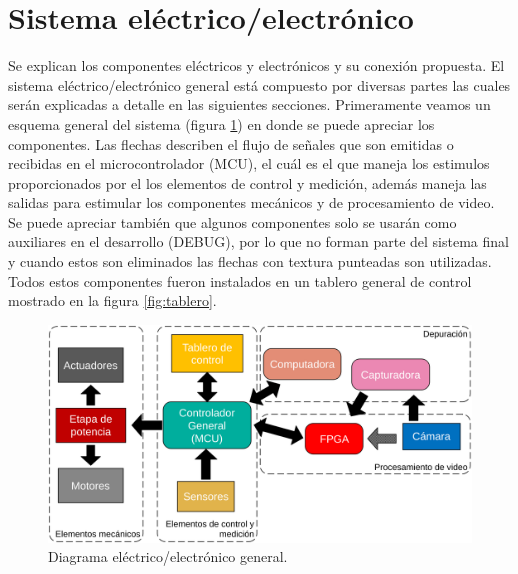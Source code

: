 \documentclass[twoside,spanish,ESP,MSc]{plantillaLabUPV}
\theoremstyle{definition}
\begin{document}
\section{Sistema eléctrico/electrónico}
Se explican los componentes eléctricos y electrónicos y su conexión propuesta. El sistema eléctrico/electrónico general está compuesto por diversas partes las cuales serán explicadas a detalle en las siguientes secciones. Primeramente veamos un esquema general del sistema (figura \ref{fig:diagramagralelectrico}) en donde se puede apreciar los componentes. Las flechas describen el flujo de señales que son emitidas o recibidas en el microcontrolador (MCU), el cuál es el que maneja los estimulos proporcionados por el los elementos de control y medición, además maneja las salidas para estimular los componentes mecánicos y de procesamiento de video. Se puede apreciar también que algunos componentes solo se usarán como auxiliares en el desarrollo (DEBUG), por lo que no forman parte del sistema final y cuando estos son eliminados las flechas con textura punteadas son utilizadas. Todos estos componentes fueron instalados en un tablero general de control mostrado en la figura \ref{fig:tablero}.

\begin{figure}[!tbh]
	\centering
	\includegraphics[width=\linewidth]{edrawimas/diagramagralelectrico}
	\caption{Diagrama eléctrico/electrónico general.}
	\label{fig:diagramagralelectrico}
\end{figure}
\end{document}
